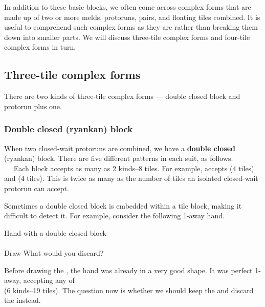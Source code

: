 \bigskip
In addition to these basic blocks, we often come across complex forms that are made up of two or more melds, protoruns, pairs, and floating tiles combined. It is useful to comprehend such complex forms as they are rather than breaking them down into smaller parts. We will discuss three-tile complex forms and four-tile complex forms in turn. 

\subsection{Three-tile complex forms} 

There are two kinds of three-tile complex forms --- double closed block and protorun plus one.

\subsubsection{Double closed ({\jap ryankan}) block} \label{sec:ryankan}
When two closed-wait protoruns are combined, we have a {\bf double closed} ({\jap ryankan}) block. 
There are five different patterns in each suit, as follows.
\bp
{}~~~~\\
~~
\ep
Each block accepts as many as 2 kinds--8 tiles. For example, {\large{}} accepts {\large{}} (4 tiles) and {\large{}} (4 tiles). This is twice as many as the number of tiles an isolated closed-wait protorun can accept. 

\bigskip
Sometimes a double closed block is embedded within a tile block, making it difficult to detect it. 
For example, consider the following 1-away hand. 
\begin{itembox}[r]{Hand with a double closed block}
\vspace{-5pt}
\bp
{}\\ \vspace{-18pt}
\rfw{}~\\
\hspace{290pt}\footnotesize{Draw}
\ep
\vspace{-15pt}What would you discard? \vspace{-5pt}
\end{itembox}
\noindent
Before drawing the {\large{}}, the hand was already in a very good shape. It was perfect 1-away, accepting any of \\{\large{}} (6 kinds--19 tiles). The question now is whether we should keep the {\large{}} and discard the {\large{}} instead. 

